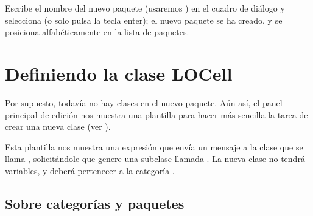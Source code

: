 \documentclass[a4paper,10pt,twoside]{book}
\begin{document}
Escribe el nombre del nuevo paquete (usaremos ) en
el cuadro de di\'alogo y selecciona  (o solo pulsa
la tecla enter); el nuevo paquete se ha creado, y se posiciona alfab\'eticamente
en la lista de paquetes.

\section{Definiendo la clase LOCell}

Por supuesto, todav\'ia no hay clases en el nuevo paquete. A\'un as\'i, el panel
principal de edici\'on nos muestra una plantilla para hacer m\'as sencilla la tarea de crear
una nueva clase (ver ).


Esta plantilla nos muestra una expresi\'on \st que env\'ia un mensaje a la clase
que se llama , solicit\'andole que genere una subclase llamada
. La nueva clase no tendr\'a variables, y deber\'a pertenecer
a la categor\'ia .

\subsection{Sobre categor\'ias y paquetes}

\end{document}
